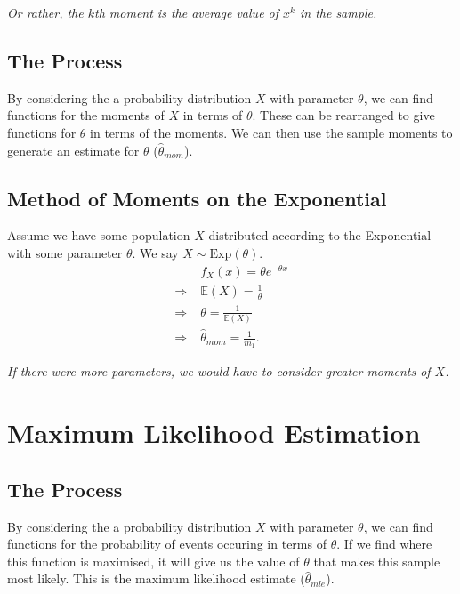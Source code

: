 \documentclass[a4paper, 12pt, twoside]{article}
\begin{document}
\textit{Or rather, the $k$th moment is the average value of $x^k$
    in the sample.}

\subsection{The Process}

By considering the a probability distribution $X$ with parameter $\theta$,
we can find functions for the moments of $X$ in terms of $\theta$. These
can be rearranged to give functions for $\theta$ in terms of the
moments. We can then use the sample moments to generate an estimate
for $\theta$ ($\hat\theta_{mom}$).

\subsection{Method of Moments on the Exponential}

Assume we have some population $X$ distributed according to the
Exponential with some parameter $\theta$. We say
$X \sim \text{Exp}(\theta)$.
\begin{align*}
                   & f_X(x) = \theta e^{-\theta x} \tag{x $>$ 0} \\
    \Rightarrow \; & \mathbb{E}(X) = \frac{1}{\theta}            \\
    \Rightarrow \; & \theta = \frac{1}{\mathbb{E}(X)}            \\
    \Rightarrow \; & \hat{\theta}_{mom} = \frac{1}{m_1}.
\end{align*}

\textit{If there were more parameters, we would have to consider
    greater moments of $X$.}

\section{Maximum Likelihood Estimation}

\subsection{The Process}

By considering the a probability distribution $X$ with parameter $\theta$,
we can find functions for the probability of events occuring in terms
of $\theta$. If we find where this function is maximised, it will give us
the value of $\theta$ that makes this sample most likely. This is the
maximum likelihood estimate ($\hat\theta_{mle}$).
\end{document}
